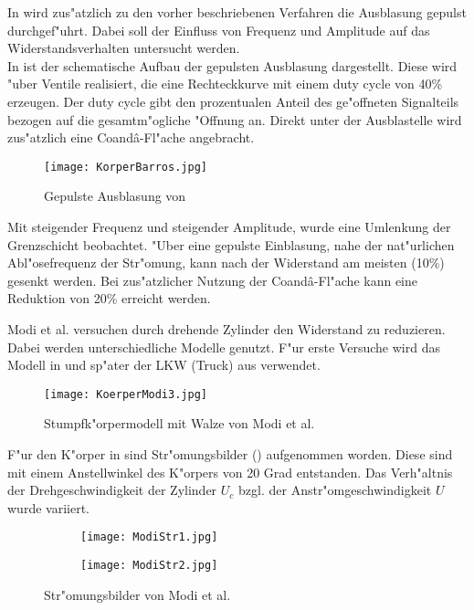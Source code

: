 In \cite{Barros.2016} wird zus"atzlich zu den vorher beschriebenen Verfahren die Ausblasung gepulst durchgef"uhrt. Dabei soll der Einfluss von Frequenz und Amplitude auf das Widerstandsverhalten untersucht werden.\\
In  ist der schematische Aufbau der gepulsten Ausblasung dargestellt. Diese wird "uber Ventile realisiert, die eine Rechteckkurve mit einem duty cycle von 40\% erzeugen. Der duty cycle gibt den prozentualen Anteil des ge"offneten Signalteils bezogen auf die gesamtm"ogliche "Offnung an. Direkt unter der Ausblastelle wird zus"atzlich eine Coand\^{a}-Fl"ache angebracht.\\
\begin{figure}[h]
	\centering
	\texttt{[image: KorperBarros.jpg]}
	\caption{Gepulste Ausblasung von \cite{Barros.2016}}
	\label{fig:Barros}
\end{figure}

Mit steigender Frequenz und steigender Amplitude, wurde eine Umlenkung der Grenzschicht beobachtet. "Uber eine gepulste Einblasung, nahe der nat"urlichen Abl"osefrequenz der Str"omung, kann nach \cite{Barros.2016} der Widerstand am meisten (10\%) gesenkt werden. Bei zus"atzlicher Nutzung der Coand\^{a}-Fl"ache kann eine Reduktion von 20\% erreicht werden.

Modi et al. \cite{MODI.1991} versuchen durch drehende Zylinder den Widerstand zu reduzieren. Dabei werden unterschiedliche Modelle genutzt. F"ur erste Versuche wird das Modell in  und sp"ater der LKW (Truck) aus  verwendet.
\begin{figure}[h]
	\centering
	\texttt{[image: KoerperModi3.jpg]}
	\caption{Stumpfk"orpermodell mit Walze von Modi et al. \cite{MODI.1991}}
	\label{fig:Modi3}
\end{figure}

F"ur den K"orper in  sind Str"omungsbilder () aufgenommen worden. Diese sind mit einem Anstellwinkel des K"orpers von 20 Grad entstanden. Das Verh"altnis der Drehgeschwindigkeit der Zylinder \(U_c\) bzgl. der Anstr"omgeschwindigkeit \(U\) wurde variiert.\\
\begin{figure}[h]
	\centering
	\begin{subfigure}[c]{0.4\textwidth}		
		\texttt{[image: ModiStr1.jpg]}
	\end{subfigure}
	\begin{subfigure}[c]{0.4\textwidth}
		\texttt{[image: ModiStr2.jpg]}
	\end{subfigure}
	\caption{Str"omungsbilder von Modi et al. \cite{MODI.1991}}
	\label{fig:ModiStr}
\end{figure}

